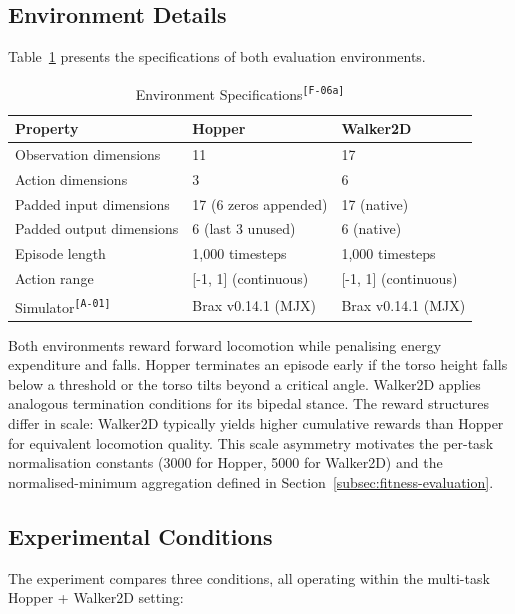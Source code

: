 \documentclass[12pt]{article}
\newcommand{\revID}[1]{\textsuperscript{\scriptsize\texttt{[#1]}}}
\newcommand{\revAcro}[2]{\textcolor{lrPurple}{#2}\revID{#1}}    %
\newcommand{\revFig}[2]{\textcolor{lrAmber}{#2}\revID{#1}}      %
\begin{document}
\subsection{Environment Details}
\label{subsec:environment-details}

Table~\ref{tab:env-specs} presents the specifications of both evaluation environments.

\begin{table}[h]
\centering
\caption{\revFig{F-06a}{Environment Specifications}}
\label{tab:env-specs}
\begin{tabular}{lll}
\toprule
\textbf{Property} & \textbf{Hopper} & \textbf{Walker2D} \\
\midrule
Observation dimensions & 11 & 17 \\
Action dimensions & 3 & 6 \\
Padded input dimensions & 17 (6 zeros appended) & 17 (native) \\
Padded output dimensions & 6 (last 3 unused) & 6 (native) \\
Episode length & 1,000 timesteps & 1,000 timesteps \\
Action range & [-1, 1] (continuous) & [-1, 1] (continuous) \\
\revAcro{A-01}{Simulator} & Brax v0.14.1 (MJX) & Brax v0.14.1 (MJX) \\
\bottomrule
\end{tabular}
\end{table}

Both environments reward forward locomotion while penalising energy expenditure and falls.
Hopper terminates an episode early if the torso height falls below a threshold or the torso tilts beyond a critical angle. Walker2D applies analogous termination conditions for its bipedal stance.
The reward structures differ in scale: Walker2D typically yields higher cumulative rewards than Hopper for equivalent locomotion quality.
This scale asymmetry motivates the per-task normalisation constants (3000 for Hopper, 5000 for Walker2D) and the normalised-minimum aggregation defined in Section~\ref{subsec:fitness-evaluation}.

\subsection{Experimental Conditions}
\label{subsec:experimental-conditions}

The experiment compares three conditions, all operating within the multi-task Hopper + Walker2D setting:
\end{document}

